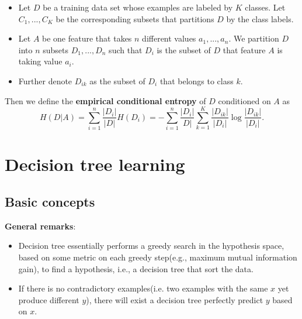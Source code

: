 \begin{refsection}
\begin{definition}\label{ch:StatisticalLearning:TreeMethods:def:empiricalConditionalEntropy}\hfill
\begin{itemize}
	\item Let $D$ be a training data set whose examples are labeled by $K$ classes. Let $C_1,...,C_K$ be the corresponding subsets that partitions $D$ by the class labels.
	\item Let $A$ be one feature that takes $n$ different values $a_1,...,a_n$. We partition $D$ into $n$ subsets $D_1,...,D_n$ such that  $D_i$ is the subset of $D$ that feature $A$ is taking value $a_i$.
	\item Further denote  $D_{ik}$ as the subset of $D_i$ that belongs to class $k$.
\end{itemize}	
Then we define the \textbf{empirical conditional entropy} of $D$  conditioned on $A$ as
	$$H(D | A)=\sum_{i=1}^{n} \frac{\left|D_{i}\right|}{|D|} H\left(D_{i}\right)=-\sum_{i=1}^{n} \frac{\left|D_{i}\right|}{D |} \sum_{k=1}^{K} \frac{\left|D_{i k}\right|}{\left|D_{i}\right|} \log \frac{\left|D_{i k}\right|}{\left|D_{i}\right|}.$$	
\end{definition}

\section{Decision tree learning}


\subsection{Basic concepts}
\begin{mdframed}
\textbf{General remarks}:
\begin{itemize}
	\item Decision tree essentially performs a greedy search in the hypothesis space, based on some metric on each greedy step(e.g., maximum mutual information gain), to find a hypothesis, i.e., a decision tree that sort the data.
	\item If there is no contradictory examples(i.e. two examples with the same $x$ yet produce different $y$), there will exist a decision tree perfectly predict $y$ based on $x$.
\end{itemize}
\end{mdframed}







\end{refsection}
